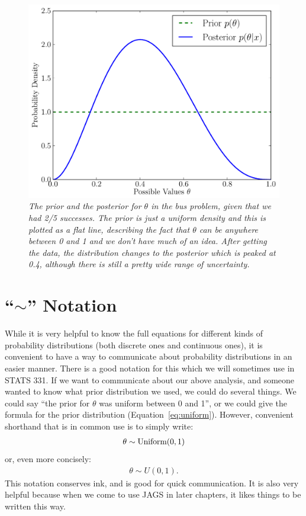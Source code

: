 \begin{figure}[ht!]
\begin{center}
\includegraphics[scale=0.6]{Figures/bus_inference.pdf}
\caption{\it The prior and the posterior for $\theta$ in the bus problem, given
that we had 2/5 successes. The prior is just a uniform density and this is
plotted as a flat line, describing the fact that $\theta$ can be anywhere between
0 and 1 and we don't have much of an idea. After getting the data, the distribution
changes to the posterior which is peaked at 0.4, although there is still a pretty
wide range of uncertainty.\label{fig:bus_inference}}
\end{center}
\end{figure}

\section{``$\sim$'' Notation}
While it is very helpful to know the full equations for different kinds of
probability distributions (both discrete ones and continuous ones), it is
convenient to have a way to communicate about probability distributions in an
easier manner. There is a good notation for this which we will sometimes use
in STATS 331. If we want to communicate about our above analysis, and someone
wanted to know what prior distribution we used, we could do several things.
We could say ``the prior for $\theta$
was uniform between 0 and 1'', or we could give the formula for the prior distribution
(Equation~\ref{eq:uniform}). However, convenient shorthand that is in common use
is to simply write:
\begin{eqnarray}
\theta \sim \textnormal{Uniform}(0, 1)
\end{eqnarray}
or, even more concisely:
\begin{eqnarray}
\theta \sim U(0, 1).
\end{eqnarray}
This notation conserves ink, and is good for quick communication.
It is also
very helpful because when we come to use JAGS in later chapters, it likes
things to be written this way.

